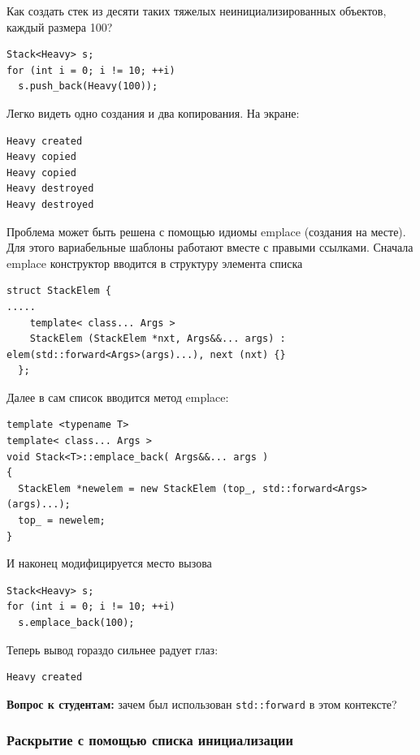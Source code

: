 \documentclass[a4paper,12pt,oneside]{article}
\newif\ifanswers
\begin{document}
Как создать стек из десяти таких тяжелых неинициализированных объектов, каждый размера 100?

\begin{lstlisting}
Stack<Heavy> s;
for (int i = 0; i != 10; ++i)
  s.push_back(Heavy(100));
\end{lstlisting}

Легко видеть одно создания и два копирования. На экране:

\begin{verbatim}
Heavy created
Heavy copied
Heavy copied
Heavy destroyed
Heavy destroyed
\end{verbatim}

Проблема может быть решена с помощью идиомы emplace (создания на месте). Для этого вариабельные шаблоны работают вместе с правыми ссылками. Сначала emplace конструктор вводится в структуру элемента списка

\begin{lstlisting}
struct StackElem {
.....
    template< class... Args >
    StackElem (StackElem *nxt, Args&&... args) : elem(std::forward<Args>(args)...), next (nxt) {}
  };
\end{lstlisting}

Далее в сам список вводится метод emplace:

\begin{lstlisting}
template <typename T>
template< class... Args >
void Stack<T>::emplace_back( Args&&... args )
{
  StackElem *newelem = new StackElem (top_, std::forward<Args>(args)...);
  top_ = newelem;
}
\end{lstlisting}

И наконец модифицируется место вызова

\begin{lstlisting}
Stack<Heavy> s;
for (int i = 0; i != 10; ++i)
  s.emplace_back(100);
\end{lstlisting}

Теперь вывод гораздо сильнее радует глаз:

\begin{verbatim}
Heavy created
\end{verbatim}

\textbf{Вопрос к студентам:} зачем был использован \lstinline!std::forward! в этом контексте?

\ifanswers
Ответ: на случай если аргументы конструктора также имеют тяжелые копирующие конструкторы. Обобщённое программирование, что уж тут.
\fi

\subsubsection{Раскрытие с помощью списка инициализации}
\end{document}
